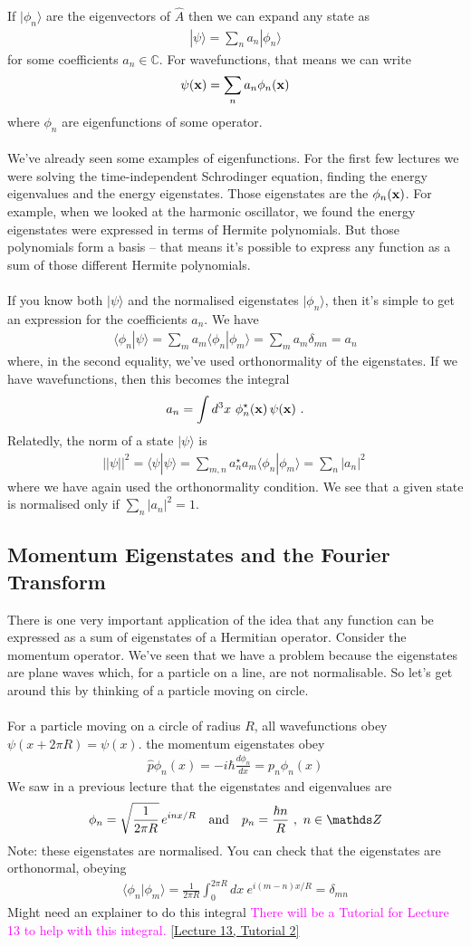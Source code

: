 \documentclass[12pt]{article}
\def\be{\begin{eqnarray}}
\def\ee{\end{eqnarray}}
\newcommand{\nn}{\nonumber}
\newcommand\para{\paragraph{}}
\newcommand{\ket}[1]{|#1\rangle}
\newcommand{\bra}[1]{\langle#1|}
\newcommand{\co}{\color{olive}}
\newcommand{\cblue}{\color{blue}}
\newcommand{\Z}{{\mathds Z}}
\newcommand{\C}{{\mathds C}}
\newcommand{\bx}{{\bf x}}
\newcommand{\alyssa}{\textcolor{magenta}}
\begin{document}
{\para
{\co If $\ket{\phi_n}$ are the eigenvectors of $\hat{A}$ then we can expand any state as
%
\be \ket{\psi} = \sum_n a_n\ket{\phi_n}\nn\ee
%
for some coefficients $a_n\in \C$. For wavefunctions, that means we can write
%
\be \psi(\bx) = \sum_n a_n \phi_n(\bx)\nn\ee
%
where $\phi_n$ are eigenfunctions of some operator.}

\para
We've already seen some examples of eigenfunctions. For the first few lectures we were solving the time-independent Schrodinger equation, finding the energy eigenvalues and the energy eigenstates. Those eigenstates are the $\phi_n(\bx)$. For example, when we looked at the harmonic oscillator, we found the energy eigenstates were expressed in terms of Hermite polynomials. But those polynomials form a basis -- that means it's possible to express any function as a sum of those different Hermite polynomials. 


\para
{\co If you know both $\ket{\psi}$ and the  normalised eigenstates $\ket{\phi_n}$, then it's simple to get an expression for the coefficients $a_n$. We have
%
\be \bra{\phi_n}{\psi}\rangle = \sum_m a_m \bra{\phi_n}{\phi_m}\rangle = \sum_m a_m \delta_{mn} = a_n\nn\ee
%
where, in the second equality, we've used orthonormality of the eigenstates. If we have wavefunctions, then this becomes the integral
%
\be a_n = \int d^3x\ \phi_n^\star(\bx)\,\psi(\bx)\ .\ee
%
Relatedly, the norm of a state $\ket{\psi}$ is
%
\be ||\psi||^2 = \bra{\psi}{\psi}\rangle = \sum_{m,n} a_n^\star a_m\bra{\phi_n}{\phi_m}\rangle= \sum_n|a_n|^2\ \ee
%
where we have again used the orthonormality condition. We see that a given state is normalised only if $\sum_n|a_n|^2 = 1$.}



\subsection{Momentum Eigenstates and the Fourier Transform}

There is one very important application of the idea that any function can be expressed as a sum of eigenstates of  a Hermitian operator. Consider the momentum operator. We've seen that we have a problem because the eigenstates are plane waves which, for a particle on a line, are not normalisable. So let's get around this by thinking of a particle moving on circle.

\para
{\co For a particle moving on a circle of radius $R$, all wavefunctions obey $\psi(x + 2\pi R) = \psi(x)$.  the momentum eigenstates obey
%
\be \hat{p}\phi_n(x) =-i\hbar\frac{d\phi_n}{dx} = p_n\phi_n(x)\nn\ee
%
We saw in a previous lecture that  the eigenstates and eigenvalues are
%
\be \phi_n = \sqrt{\frac{1}{2\pi R}}\,e^{inx/R} \ \ \ {\rm and}\ \ \ p_n =\frac{\hbar n}{R} \ , \   n\in \Z\nn\ee
%
Note: these eigenstates are normalised. You can check that the eigenstates are orthonormal, obeying
%
\be \bra{\phi_n}{\phi_m}\rangle = \frac{1}{2\pi R}\int_0^{2\pi R} dx\ e^{i(m-n)x/R} =\delta_{mn} \nn\ee
%
} {\cblue Might need an explainer to do this integral} \alyssa{There will be a Tutorial for Lecture 13 to help with this integral.} \href{https://drive.google.com/file/d/1EExmeqJf8ICMpsf0w5eeV5qmQL_5w-Lx/view?usp=drive_link}{[Lecture 13, Tutorial 2]}

}
\end{document}
